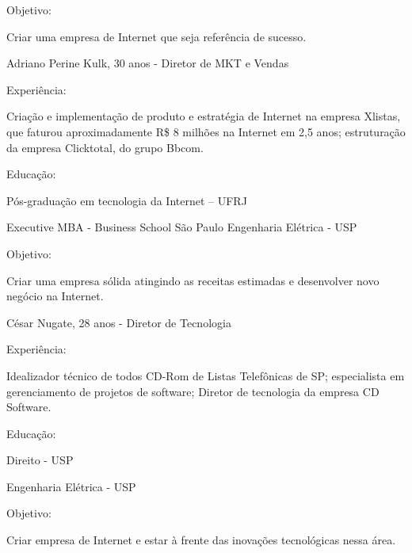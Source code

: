 \noindent Objetivo:\par
\noindent Criar uma empresa de Internet que seja referência de sucesso.\\ \par

Adriano Perine Kulk, 30 anos - Diretor de MKT e Vendas\par

\noindent Experiência:\par
\noindent Criação e implementação de produto e estratégia de Internet na empresa Xlistas, que faturou aproximadamente R\$ 8 milhões na Internet em 2,5 anos;
estruturação da empresa Clicktotal, do grupo Bbcom.\par

\noindent Educação:\par
\noindent Pós-graduação em tecnologia da Internet – UFRJ\par
\noindent Executive MBA - Business School São Paulo\noindent
\noindent Engenharia Elétrica - USP\par

\noindent Objetivo:\par
\noindent Criar uma empresa sólida atingindo as receitas estimadas e desenvolver novo
negócio na Internet.\\ \par

César Nugate, 28 anos - Diretor de Tecnologia\par

\noindent Experiência:\par
\noindent Idealizador técnico de todos CD-Rom de Listas Telefônicas de SP; especialista
em gerenciamento de projetos de software; Diretor de tecnologia da empresa CD Software.\par
\noindent Educação:\par
\noindent Direito - USP \par
\noindent Engenharia Elétrica - USP \par
\noindent Objetivo:\par
\noindent Criar empresa de Internet e estar à frente das inovações tecnológicas nessa
área.\par
